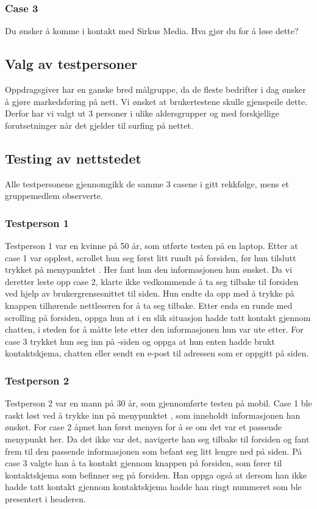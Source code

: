 \subsubsection{Case 3}
Du ønsker å komme i kontakt med Sirkus Media. Hva gjør du for å løse dette?

\subsection{Valg av testpersoner }
Oppdragsgiver har en ganske bred målgruppe, da de fleste bedrifter i dag ønsker å gjøre markedsføring på nett. Vi ønsket at brukertestene skulle gjenspeile dette. Derfor har vi valgt ut 3 personer i ulike aldersgrupper og med forskjellige forutsetninger når det gjelder til surfing på nettet.


\subsection{Testing av nettstedet}
Alle testpersonene gjennomgikk de samme 3 casene i gitt rekkfølge, mens et gruppemedlem observerte.

\subsubsection{Testperson 1}
Testperson 1 var en kvinne på 50 år, som utførte testen på en laptop. Etter at case 1 var opplest, scrollet hun seg først litt rundt på forsiden, før hun tilslutt trykket på menypunktet . Her fant hun den informasjonen hun ønsket. Da vi deretter leste opp case 2, klarte ikke vedkommende å ta seg tilbake til forsiden ved hjelp av brukergrensesnittet til siden. Hun endte da opp med å trykke på knappen tilhørende nettleseren for å ta seg tilbake. Etter enda en runde med scrolling på forsiden, oppga hun at i en slik situasjon hadde tatt kontakt gjennom chatten, i steden for å måtte lete etter den informasjonen hun var ute etter. For case 3 trykket hun seg inn på -siden og oppga at hun enten hadde brukt kontaktskjema, chatten eller sendt en e-post til adressen som er oppgitt på siden.

\subsubsection{Testperson 2}
Testperson 2 var en mann på 30 år, som gjennomførte testen på mobil. Case 1 ble raskt løst ved å trykke inn på menypunktet , som inneholdt informasjonen han ønsket. For case 2 åpnet han først menyen for å se om det var et passende menypunkt her. Da det ikke var det, navigerte han seg tilbake til forsiden og fant frem til den passende informasjonen som befant seg litt lengre ned på siden. På case 3 valgte han å ta kontakt gjennom knappen på forsiden, som fører til kontaktskjema som befinner seg på forsiden. Han oppga også at dersom han ikke hadde tatt kontakt gjennom kontaktskjema hadde han ringt nummeret som ble presentert i headeren. 

